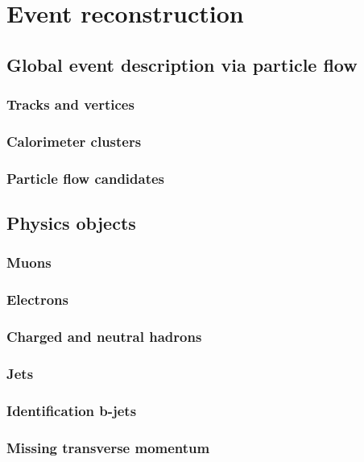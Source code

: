 \chapter{Event reconstruction}
\label{ch:reconstruction}
\section{Global event description via particle flow}
  \subsection{Tracks and vertices}
  \subsection{Calorimeter clusters}
  \subsection{Particle flow candidates}
\section{Physics objects}
  \subsection{Muons}
  \subsection{Electrons}
  \subsection{Charged and neutral hadrons}
  \subsection{Jets}
  \subsection{Identification b-jets}
  \subsection{Missing transverse momentum}

